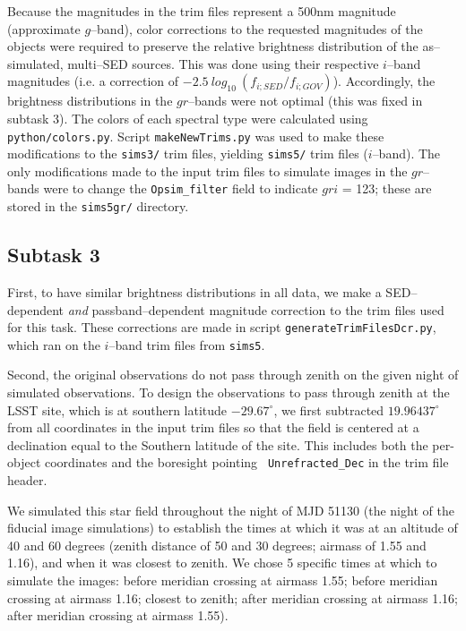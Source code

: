 \documentclass[DM,toc]{lsstdoc}
\begin{document}
Because the magnitudes in the trim files represent a 500nm magnitude
(approximate $g$--band), color corrections to the requested magnitudes
of the objects were required to preserve the relative brightness
distribution of the as--simulated, multi--SED sources.  This was done
using their respective $i$--band magnitudes (i.e. a correction of
$-2.5~log_{10}~( f_{i;SED} / f_{i;GOV} )$).  Accordingly, the
brightness distributions in the $gr$--bands were not optimal (this was
fixed in subtask 3).  The colors of each spectral type were calculated
using {\tt python/colors.py}.  Script {\tt makeNewTrims.py} was used
to make these modifications to the {\tt sims3/} trim files, yielding
{\tt sims5/} trim files ($i$--band).  The only modifications made to
the input trim files to simulate images in the $gr$--bands were to
change the {\tt Opsim\_filter} field to indicate $gri$ = 123; these
are stored in the {\tt sims5gr/} directory.

\subsection{Subtask 3}

First, to have similar brightness distributions in all data, we make a
SED--dependent {\it and} passband--dependent magnitude correction to
the trim files used for this task.  These corrections are made in
script {\tt generateTrimFilesDcr.py}, which ran on the $i$--band trim
files from {\tt sims5}.

Second, the original observations do not pass through zenith on the
given night of simulated observations.  To design the observations to
pass through zenith at the LSST site, which is at southern latitude
$-29.67^{\circ}$, we first subtracted $19.96437^{\circ}$ from all
coordinates in the input trim files so that the field is centered at a
declination equal to the Southern latitude of the site.  This includes
both the per-object coordinates and the boresight pointing {\tt
  Unrefracted\_Dec} in the trim file header.

We simulated this star field throughout the night of MJD 51130 (the
night of the fiducial image simulations) to establish the times at
which it was at an altitude of 40 and 60 degrees (zenith distance of
50 and 30 degrees; airmass of 1.55 and 1.16), and when it was closest
to zenith.  We chose 5 specific times at which to simulate the images:
before meridian crossing at airmass 1.55; before meridian crossing at
airmass 1.16; closest to zenith; after meridian crossing at airmass
1.16; after meridian crossing at airmass 1.55).
\end{document}
